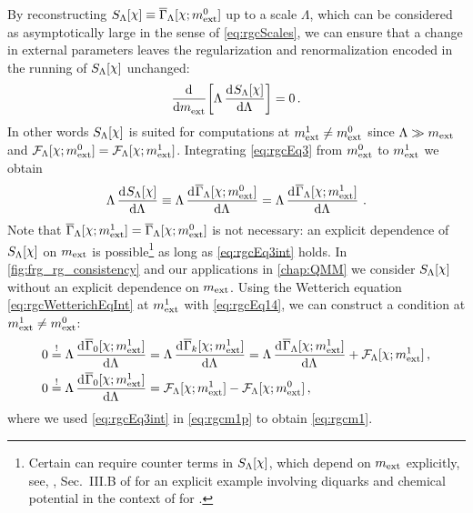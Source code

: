 By reconstructing $S_\Lambda[\FSsf]\equiv\FSeaa_\Lambda[\FSsf;m_\ext^0]$ up to a scale $\Lambda$, which can be considered as asymptotically large in the sense of \cref{eq:rgcScales}, we can ensure that a change in external parameters leaves the regularization and renormalization encoded in the running of $S_\Lambda[\FSsf]$ unchanged:
\begin{align}
	\dod{}{m_\ext}\!\sbr{\Lambda\dod{S_\Lambda[\FSsf]}{\Lambda}}=0\,.
	\label{eq:rgcEq3} 
\end{align}
In other words $S_\Lambda[\FSsf]$ is suited for computations at $m_{\mathrm{ext}}^1\neq m_{\mathrm{ext}}^0$ since $\Lambda\gg m_{\mathrm{ext}}$ and $\FRGflow_{\Lambda}[\FSsf;m_\ext^0]=\FRGflow_{\Lambda}[\FSsf;m_\ext^1]$.
Integrating \cref{eq:rgcEq3} from $m_{\mathrm{ext}}^0$ to $m_{\mathrm{ext}}^1$ we obtain
\begin{align}
	\Lambda\dod{S_\Lambda[\FSsf]}{\Lambda} \equiv \Lambda\dod{\FSeaa_\Lambda[\FSsf;m_\ext^0]}{\Lambda} = \Lambda\dod{\FSeaa_\Lambda[\FSsf;m_\ext^1]}{\Lambda}\,.
	\label{eq:rgcEq3int}
\end{align}
Note that $\FSeaa_\Lambda[\FSsf;m_\ext^1]=\FSeaa_\Lambda[\FSsf;m_\ext^0]$ is not necessary: an explicit dependence of $S_\Lambda[\FSsf]$ on $m_{\mathrm{ext}}$ is possible\footnote{
	Certain \loefts{} can require counter terms in $S_\Lambda[\FSsf]$, which depend on $m_{\mathrm{ext}}$ explicitly, see, \eg{}, Sec.~III.B of  for an explicit example involving diquarks and chemical potential in the context of \loefts{} for \qcd{}.%
} as long as \cref{eq:rgcEq3int} holds.
In \cref{fig:frg_rg_consistency} and our applications in \cref{chap:QMM} we consider $S_\Lambda[\FSsf]$ without an explicit dependence on $m_{\mathrm{ext}}$.
Using the Wetterich equation \eqref{eq:rgcWetterichEqInt} at $m_{\mathrm{ext}}^1$ with \cref{eq:rgcEq14}, we can construct a \rgcy{} condition at $m_{\mathrm{ext}}^1\neq m_{\mathrm{ext}}^0$:
\begin{subequations}\label{eq:rgcm}
\begin{align}
	0&\overset{!}{=} \Lambda\dod{\FSeaa_0[\FSsf;m_\ext^1]}{\Lambda} =\Lambda\dod{\FSeaa_k[\FSsf;m_\ext^1]}{\Lambda}= \Lambda\dod{\FSeaa_\Lambda[\FSsf;m_\ext^1]}{\Lambda} + \FRGflow_{\Lambda}[\FSsf;m_\ext^1]\, ,\label{eq:rgcm1p}\\
	0&\overset{!}{=}\Lambda\dod{\FSeaa_0[\FSsf;m_\ext^1]}{\Lambda} = \FRGflow_{\Lambda}[\FSsf;m_\ext^1]-\FRGflow_{\Lambda}[\FSsf;m_\ext^0]\label{eq:rgcm1}\, ,
\end{align}
\end{subequations}
where we used \cref{eq:rgcEq3int} in \cref{eq:rgcm1p} to obtain \cref{eq:rgcm1}.
